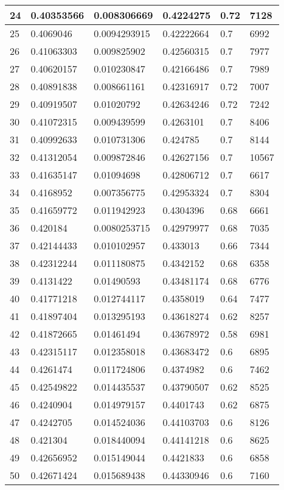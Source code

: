 \begin{longtable}{|l|l|l|l|l|l|}
24 & 0.40353566 & 0.008306669 & 0.4224275 & 0.72 & 7128 \\ \hline 
25 & 0.4069046 & 0.0094293915 & 0.42222664 & 0.7 & 6992 \\ \hline 
26 & 0.41063303 & 0.009825902 & 0.42560315 & 0.7 & 7977 \\ \hline 
27 & 0.40620157 & 0.010230847 & 0.42166486 & 0.7 & 7989 \\ \hline 
28 & 0.40891838 & 0.008661161 & 0.42316917 & 0.72 & 7007 \\ \hline 
29 & 0.40919507 & 0.01020792 & 0.42634246 & 0.72 & 7242 \\ \hline 
30 & 0.41072315 & 0.009439599 & 0.4263101 & 0.7 & 8406 \\ \hline 
31 & 0.40992633 & 0.010731306 & 0.424785 & 0.7 & 8144 \\ \hline 
32 & 0.41312054 & 0.009872846 & 0.42627156 & 0.7 & 10567 \\ \hline 
33 & 0.41635147 & 0.01094698 & 0.42806712 & 0.7 & 6617 \\ \hline 
34 & 0.4168952 & 0.007356775 & 0.42953324 & 0.7 & 8304 \\ \hline 
35 & 0.41659772 & 0.011942923 & 0.4304396 & 0.68 & 6661 \\ \hline 
36 & 0.420184 & 0.0080253715 & 0.42979977 & 0.68 & 7035 \\ \hline 
37 & 0.42144433 & 0.010102957 & 0.433013 & 0.66 & 7344 \\ \hline 
38 & 0.42312244 & 0.011180875 & 0.4342152 & 0.68 & 6358 \\ \hline 
39 & 0.4131422 & 0.01490593 & 0.43481174 & 0.68 & 6776 \\ \hline 
40 & 0.41771218 & 0.012744117 & 0.4358019 & 0.64 & 7477 \\ \hline 
41 & 0.41897404 & 0.013295193 & 0.43618274 & 0.62 & 8257 \\ \hline 
42 & 0.41872665 & 0.01461494 & 0.43678972 & 0.58 & 6981 \\ \hline 
43 & 0.42315117 & 0.012358018 & 0.43683472 & 0.6 & 6895 \\ \hline 
44 & 0.4261474 & 0.011724806 & 0.4374982 & 0.6 & 7462 \\ \hline 
45 & 0.42549822 & 0.014435537 & 0.43790507 & 0.62 & 8525 \\ \hline 
46 & 0.4240904 & 0.014979157 & 0.4401743 & 0.62 & 6875 \\ \hline 
47 & 0.4242705 & 0.014524036 & 0.44103703 & 0.6 & 8126 \\ \hline 
48 & 0.421304 & 0.018440094 & 0.44141218 & 0.6 & 8625 \\ \hline 
49 & 0.42656952 & 0.015149044 & 0.4421833 & 0.6 & 6858 \\ \hline 
50 & 0.42671424 & 0.015689438 & 0.44330946 & 0.6 & 7160 \\ \hline 
\end{longtable}